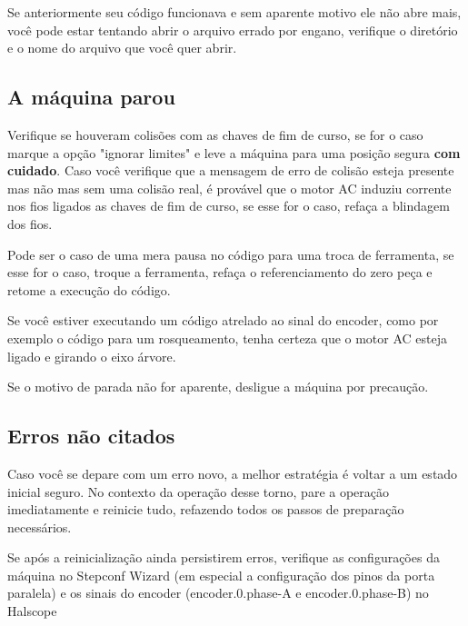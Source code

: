 \documentclass[twoside,a4paper]{refart}
\begin{document}
Se anteriormente seu código funcionava e sem aparente motivo ele não abre mais, você pode estar tentando abrir o arquivo errado por engano, verifique o diretório e o nome do arquivo que você quer abrir.

\subsection{A máquina parou}

Verifique se houveram colisões com as chaves de fim de curso, se for o caso marque a opção "ignorar limites" e leve a máquina para uma posição segura \textbf{com cuidado}. Caso você verifique que a mensagem de erro de colisão esteja presente mas não mas sem uma colisão real, é provável que o motor AC induziu corrente nos fios ligados as chaves de fim de curso, se esse for o caso, refaça a blindagem dos fios. 

Pode ser o caso de uma mera pausa no código para uma troca de ferramenta, se esse for o caso, troque a ferramenta, refaça o referenciamento do zero peça e retome a execução do código.

Se você estiver executando um código atrelado ao sinal do encoder, como por exemplo o código para um rosqueamento, tenha certeza que o motor AC esteja ligado e girando o eixo árvore.

\attention Se o motivo de parada não for aparente, desligue a máquina por precaução.

\subsection{Erros não citados}

Caso você se depare com um erro novo, a melhor estratégia é voltar a um estado inicial seguro. No contexto da operação desse torno, pare a operação imediatamente e reinicie tudo, refazendo todos os passos de preparação necessários.

Se após a reinicialização ainda persistirem erros, verifique as configurações da máquina no Stepconf Wizard (em especial a configuração dos pinos da porta paralela) e os sinais do encoder (encoder.0.phase-A e encoder.0.phase-B) no Halscope
\end{document}
